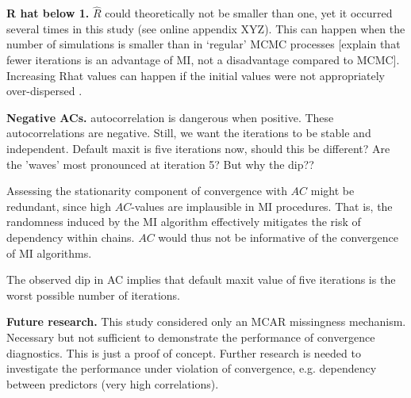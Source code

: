 \documentclass[article]{jss}
\begin{document}
\textbf{R hat below 1.}
$\widehat{R}$ could theoretically not be smaller than one, yet it occurred several times in this study (see online appendix XYZ). This can happen when the number of simulations is smaller than in `regular' MCMC processes [explain that fewer iterations is an advantage of MI, not a disadvantage compared to MCMC]. Increasing Rhat values can happen if the initial values were not appropriately over-dispersed \citep[p~438]{broo98}. %


\textbf{Negative ACs.} autocorrelation is dangerous when positive. These autocorrelations are negative. Still, we want the iterations to be stable and independent. Default maxit is five iterations now, should this be different? Are the 'waves' most pronounced at iteration 5? But why the dip?? 

Assessing the stationarity component of convergence with $AC$ might be redundant, since high $AC$-values are implausible in MI procedures. That is, the randomness induced by the MI algorithm effectively mitigates the risk of dependency within chains. $AC$ would thus not be informative of the convergence of MI algorithms. 


The observed dip in AC implies that default maxit value of five iterations is the worst possible number of iterations.

\textbf{Future research.} This study considered only an MCAR missingness mechanism. Necessary but not sufficient to demonstrate the performance of convergence diagnostics. This is just a proof of concept. Further research is needed to investigate the performance under violation of convergence, e.g. dependency between predictors (very high correlations). %
\end{document}
